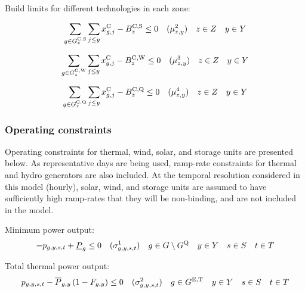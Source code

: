 \documentclass{article}
\newcommand{\sScenarioSets}{\quad  \iYear \in \sYears \quad  \iScenario \in \sScenarios \quad  \iInterval \in \sIntervals}
\begin{document}
Build limits for different technologies in each zone:

\begin{equation}
\sum\limits_{\iGenerator \in \sGeneratorsCandidateSolar_{\iZone}} \sum\limits_{\iYearAlias \leq \iYear} \vInstalledCapacity[\iGenerator,\iYearAlias] - \cBuildLimitSolar \leq 0 \quad (\dSolarBuildLimit) \quad  \iZone \in \sZones \quad  \iYear \in \sYears
\end{equation}

\begin{equation}
\sum\limits_{\iGenerator \in \sGeneratorsCandidateWind_{\iZone}} \sum\limits_{\iYearAlias \leq \iYear} \vInstalledCapacity[\iGenerator,\iYearAlias] - \cBuildLimitWind \leq 0 \quad (\dWindBuildLimit) \quad  \iZone \in \sZones \quad  \iYear \in \sYears 
\end{equation}

\begin{equation}
\sum\limits_{\iGenerator \in \sStorageCandidate_{\iZone}}  \sum\limits_{\iYearAlias \leq \iYear} \vInstalledCapacity[\iGenerator,\iYearAlias] - \cBuildLimitStorage \leq 0  \quad (\dStorageBuildLimit) \quad  \iZone \in \sZones \quad  \iYear \in \sYears
\label{eqn: storage build limits}
\end{equation}

\subsubsection{Operating constraints}
Operating constraints for thermal, wind, solar, and storage units are presented below. As representative days are being used, ramp-rate constraints for thermal and hydro generators are also included. At the temporal resolution considered in this model (hourly), solar, wind, and storage units are assumed to have sufficiently high ramp-rates that they will be non-binding, and are not included in the model.

Minimum power output:
\begin{equation}
	-\vPower + \cPowerOutputMin \leq 0 \quad (\dMinPowerOutput) \quad  \iGenerator \in \sGenerators \setminus \sStorage \sScenarioSets
\end{equation}

Total thermal power output:
\begin{equation}
	\vPower - \cPowerOutputMax \left(1 - \cRetirementIndicator\right) \leq 0 \quad (\dMaxPowerOutputExistingThermal) \quad  \iGenerator \in \sGeneratorsExistingThermal \sScenarioSets
\end{equation}
\end{document}
